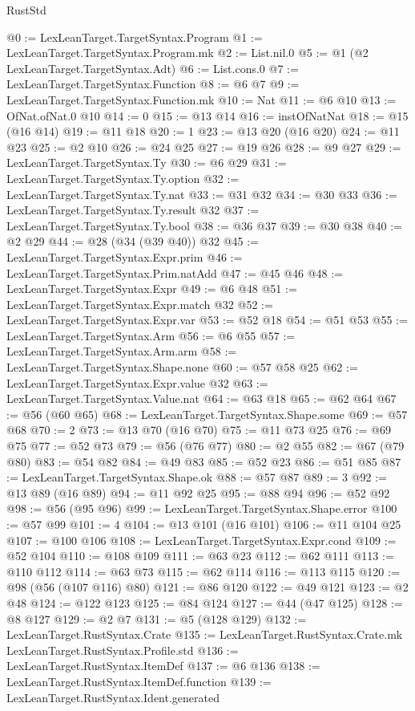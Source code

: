 \begin{lexlean}{RustStd}
\begin{coremodule}
@0 := LexLeanTarget.TargetSyntax.Program
@1 := LexLeanTarget.TargetSyntax.Program.mk
@2 := List.nil.{0}
@5 := @1 (@2 LexLeanTarget.TargetSyntax.Adt)
@6 := List.cons.{0}
@7 := LexLeanTarget.TargetSyntax.Function
@8 := @6 @7
@9 := LexLeanTarget.TargetSyntax.Function.mk
@10 := Nat
@11 := @6 @10
@13 := OfNat.ofNat.{0} @10
@14 := 0
@15 := @13 @14
@16 := instOfNatNat
@18 := @15 (@16 @14)
@19 := @11 @18
@20 := 1
@23 := @13 @20 (@16 @20)
@24 := @11 @23
@25 := @2 @10
@26 := @24 @25
@27 := @19 @26
@28 := @9 @27
@29 := LexLeanTarget.TargetSyntax.Ty
@30 := @6 @29
@31 := LexLeanTarget.TargetSyntax.Ty.option
@32 := LexLeanTarget.TargetSyntax.Ty.nat
@33 := @31 @32
@34 := @30 @33
@36 := LexLeanTarget.TargetSyntax.Ty.result @32
@37 := LexLeanTarget.TargetSyntax.Ty.bool
@38 := @36 @37
@39 := @30 @38
@40 := @2 @29
@44 := @28 (@34 (@39 @40)) @32
@45 := LexLeanTarget.TargetSyntax.Expr.prim
@46 := LexLeanTarget.TargetSyntax.Prim.natAdd
@47 := @45 @46
@48 := LexLeanTarget.TargetSyntax.Expr
@49 := @6 @48
@51 := LexLeanTarget.TargetSyntax.Expr.match @32
@52 := LexLeanTarget.TargetSyntax.Expr.var
@53 := @52 @18
@54 := @51 @53
@55 := LexLeanTarget.TargetSyntax.Arm
@56 := @6 @55
@57 := LexLeanTarget.TargetSyntax.Arm.arm
@58 := LexLeanTarget.TargetSyntax.Shape.none
@60 := @57 @58 @25
@62 := LexLeanTarget.TargetSyntax.Expr.value @32
@63 := LexLeanTarget.TargetSyntax.Value.nat
@64 := @63 @18
@65 := @62 @64
@67 := @56 (@60 @65)
@68 := LexLeanTarget.TargetSyntax.Shape.some
@69 := @57 @68
@70 := 2
@73 := @13 @70 (@16 @70)
@75 := @11 @73 @25
@76 := @69 @75
@77 := @52 @73
@79 := @56 (@76 @77)
@80 := @2 @55
@82 := @67 (@79 @80)
@83 := @54 @82
@84 := @49 @83
@85 := @52 @23
@86 := @51 @85
@87 := LexLeanTarget.TargetSyntax.Shape.ok
@88 := @57 @87
@89 := 3
@92 := @13 @89 (@16 @89)
@94 := @11 @92 @25
@95 := @88 @94
@96 := @52 @92
@98 := @56 (@95 @96)
@99 := LexLeanTarget.TargetSyntax.Shape.error
@100 := @57 @99
@101 := 4
@104 := @13 @101 (@16 @101)
@106 := @11 @104 @25
@107 := @100 @106
@108 := LexLeanTarget.TargetSyntax.Expr.cond
@109 := @52 @104
@110 := @108 @109
@111 := @63 @23
@112 := @62 @111
@113 := @110 @112
@114 := @63 @73
@115 := @62 @114
@116 := @113 @115
@120 := @98 (@56 (@107 @116) @80)
@121 := @86 @120
@122 := @49 @121
@123 := @2 @48
@124 := @122 @123
@125 := @84 @124
@127 := @44 (@47 @125)
@128 := @8 @127
@129 := @2 @7
@131 := @5 (@128 @129)
@132 := LexLeanTarget.RustSyntax.Crate
@135 := LexLeanTarget.RustSyntax.Crate.mk LexLeanTarget.RustSyntax.Profile.std
@136 := LexLeanTarget.RustSyntax.ItemDef
@137 := @6 @136
@138 := LexLeanTarget.RustSyntax.ItemDef.function
@139 := LexLeanTarget.RustSyntax.Ident.generated

\end{coremodule}
\end{lexlean}
